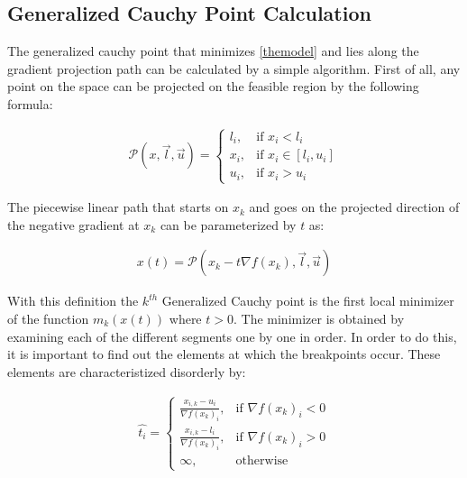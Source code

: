 \subsection{Generalized Cauchy Point Calculation}

The generalized cauchy point that minimizes \ref{themodel} and lies along the gradient projection path can be calculated by a simple algorithm. First of all, any point on the space can be projected on the feasible region by the following formula: 

\begin{equation}
  \begin{aligned}
    \mathcal{P}(x, \vec{l}, \vec{u}) = 
    \begin{cases}
      l_i, & \text{if } x_i < l_i \\
      x_i, & \text{if } x_i \in [l_i, u_i] \\
      u_i, & \text{if } x_i > u_i
    \end{cases}
  \end{aligned}
\end{equation}

The piecewise linear path that starts on $x_k$ and goes on the projected direction of the negative gradient at $x_k$ can be parameterized by $t$ as:

\begin{equation}
  \begin{aligned}
    x(t) = \mathcal{P}(x_k - t \nabla f(x_k), \vec{l}, \vec{u})
  \end{aligned}
\end{equation}

With this definition the $k^{th}$ Generalized Cauchy point is the first local minimizer of the function $m_k(x(t))$ where $t > 0$. The minimizer is obtained by examining each of the different segments one by one in order. In order to do this, it is important to find out the elements at which the breakpoints occur. These elements are characteristized disorderly by:

\begin{equation} 
  \begin{aligned} \label{findingt}
    \hat{t_i} = 
    \begin{cases}
      \frac{x_{i,k} - u_i}{\nabla f(x_k)_i}, & \text{if } \nabla f(x_k)_i < 0 \\
      \frac{x_{i,k} - l_i}{\nabla f(x_k)_i}, & \text{if } \nabla f(x_k)_i > 0 \\
      \infty, & \text{otherwise}
    \end{cases}
  \end{aligned}
\end{equation}

